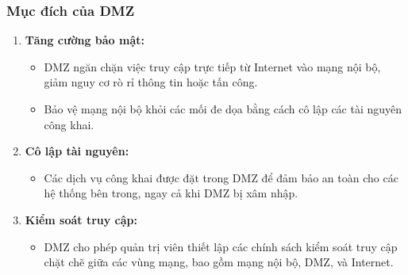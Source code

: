 \documentclass[13pt]{article}
\begin{document}
\subsubsection{Mục đích của DMZ}
\begin{enumerate}
    \item \textbf{Tăng cường bảo mật:}
    \begin{itemize}
        \item DMZ ngăn chặn việc truy cập trực tiếp từ Internet vào mạng nội bộ, giảm nguy cơ rò rỉ thông tin hoặc tấn công.
        \item Bảo vệ mạng nội bộ khỏi các mối đe dọa bằng cách cô lập các tài nguyên công khai.
    \end{itemize}

    \item \textbf{Cô lập tài nguyên:}
    \begin{itemize}
        \item Các dịch vụ công khai được đặt trong DMZ để đảm bảo an toàn cho các hệ thống bên trong, ngay cả khi DMZ bị xâm nhập.
    \end{itemize}
    \item \textbf{Kiểm soát truy cập:}
    \begin{itemize}
        \item DMZ cho phép quản trị viên thiết lập các chính sách kiểm soát truy cập chặt chẽ giữa các vùng mạng, bao gồm mạng nội bộ, DMZ, và Internet.
    \end{itemize}
\end{enumerate}
\end{document}
